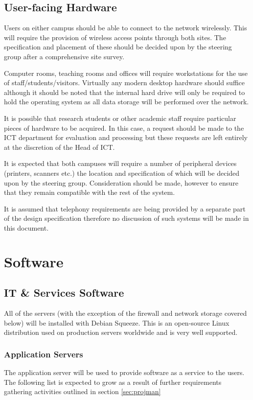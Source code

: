 \documentclass[a4paper, twoside]{article}
\begin{document}
\subsection{User-facing Hardware}
Users on either campus should be able to connect to the network wirelessly. This
will require the provision of wireless access points through both sites. The
specification and placement of these should be decided upon by the steering
group after a comprehensive site survey.

Computer rooms, teaching rooms and offices will require workstations for the use
of staff/students/visitors. Virtually any modern desktop hardware should suffice
although it should be noted that the internal hard drive will only be required
to hold the operating system as all data storage will be performed over the
network.

It is possible that research students or other academic staff require particular
pieces of hardware to be acquired. In this case, a request should be made to the
ICT department for evaluation and processing but these requests are left
entirely at the discretion of the Head of ICT.

It is expected that both campuses will require a number of peripheral devices
(printers, scanners etc.) the location and specification of which will be
decided upon by the steering group. Consideration should be made, however to
ensure that they remain compatible with the rest of the system.

It is assumed that telephony requirements are being provided by a separate part
of the design specification therefore no discussion of such systems will be made
in this document.

\section{Software}
\subsection{IT \& Services Software}
All of the servers (with the exception of the firewall and network storage
covered below) will be installed with Debian Squeeze. This is an open-source
Linux distribution used on production servers worldwide\cite{debian} and is
very well supported.

\subsubsection{Application Servers}
The application server will be used to provide software as a service to the
users. The following list is expected to grow as a result of further
requirements gathering activities outlined in section \ref{sec:projman}
\end{document}
